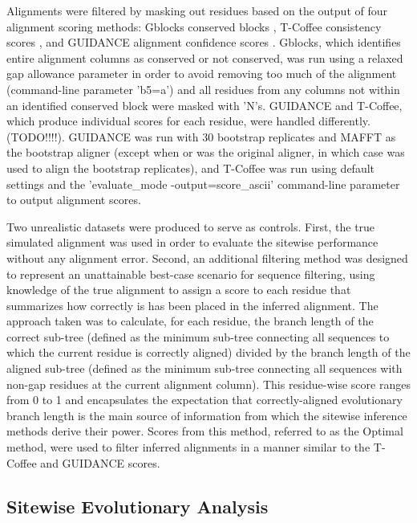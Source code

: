 \documentclass{mbe}
\begin{document}
Alignments were filtered by masking out residues based on the output
of four alignment scoring methods: Gblocks conserved blocks
\citep{Castresana2000Selection}, T-Coffee consistency scores
\citep{Notredame2000TCoffee,Notedame2003Using}, and GUIDANCE alignment
confidence scores \citep{Penn2010Alignment}. Gblocks, which identifies
entire alignment columns as conserved or not conserved, was run using
a relaxed gap allowance parameter in order to avoid removing too much
of the alignment (command-line parameter 'b5=a') and all residues from
any columns not within an identified conserved block were masked with
'N's. GUIDANCE and T-Coffee, which produce individual scores for each
residue, were handled differently. (TODO!!!!). GUIDANCE was run with 30
bootstrap replicates and MAFFT as the bootstrap aligner (except when
\pranka{} or \prankc{} was the original aligner, in which case \pranka{}
was used to align the bootstrap replicates), and T-Coffee was run
using default settings and the 'evaluate\_mode -output=score\_ascii'
command-line parameter to output alignment scores.

Two unrealistic datasets were produced to serve as controls. First,
the true simulated alignment was used in order to evaluate the
sitewise performance without any alignment error. Second, an
additional filtering method was designed to represent an unattainable
best-case scenario for sequence filtering, using knowledge of the true
alignment to assign a score to each residue that summarizes how
correctly is has been placed in the inferred alignment. The approach
taken was to calculate, for each residue, the branch length of the
correct sub-tree (defined as the minimum sub-tree connecting all
sequences to which the current residue is correctly aligned) divided
by the branch length of the aligned sub-tree (defined as the minimum
sub-tree connecting all sequences with non-gap residues at the current
alignment column). This residue-wise score ranges from 0 to 1 and
encapsulates the expectation that correctly-aligned evolutionary
branch length is the main source of information from which the
sitewise inference methods derive their power. Scores from this
method, referred to as the Optimal method, were used to filter
inferred alignments in a manner similar to the T-Coffee and GUIDANCE
scores.

\subsection*{Sitewise Evolutionary Analysis}
\end{document}
